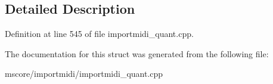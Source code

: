 \subsection{Detailed Description}


Definition at line 545 of file importmidi\+\_\+quant.\+cpp.



The documentation for this struct was generated from the following file\+:\begin{DoxyCompactItemize}
\item 
mscore/importmidi/importmidi\+\_\+quant.\+cpp\end{DoxyCompactItemize}

